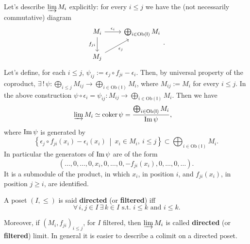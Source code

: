 \begin{ex}
	Let's describe $\varinjlim M_i$ explicitly: for every $i \leq j$ we have the (not necessarily commutative) diagram
	\begin{equation}
	\begin{tikzcd}
		M_i \arrow[r, "\epsilon_i", rightarrow] \arrow[d, "f_{ji}"', rightarrow] &
		\bigoplus_{i \in \mathrm{Ob} \left(\mathsf{I}\right)} M_i \\
		M_j \arrow[ru, "\epsilon_j"', rightarrow] & 
	\end{tikzcd} 
	.\end{equation}
	Let's define, for each $i \leq j$, $\psi_{ij} := \epsilon_j \circ f_{ji} - \epsilon_i$.
	Then, by universal property of the coproduct,
	$\exists\, !\, \psi: \bigoplus_{i \leq j} M_{ij} \to \bigoplus_{i \in \mathrm{Ob} \left(\mathsf{I}\right)} M_{i}$,
	where $M_{ij} := M_i$ for every $i \leq j$.
	In the above construction $\psi \circ \epsilon_i = \psi_{ij}: M_{ij} \to \bigoplus_{i \in \mathrm{Ob} \left(\mathsf{I}\right)} M_i$.
	Then we have
	\begin{align}
		\varinjlim M_i &\simeq \operatorname{coker} \psi =
		\frac{\bigoplus_{i \in \mathrm{Ob} \left(\mathsf{I}\right)} M_i}{\operatorname{Im} \psi}
	,\end{align}
	where $\operatorname{Im} \psi$ is generated by
	\begin{equation}
		\left\{ \epsilon_j \circ f_{ji}(x_i) - \epsilon_i(x_i) \ \middle|\ 
		x_i \in M_i,\ i \leq j \right\} \subset
		\bigoplus_{i \in \mathrm{Ob} \left(\mathsf{I}\right)} M_i
	.\end{equation} 
	In particular the generators of $\operatorname{Im} \psi$ are of the form
	\begin{equation}
		\left( \ldots, 0, \ldots, 
		0, x_i, 0, \ldots, 0, - f_{ji}(x_i),
		0, \ldots, 0, \ldots \right)
	.\end{equation} 	
	It is a submodule of the product, in which $x_i$, in position $i$,
	and $f_{ji}(x_i)$, in position $j \geq i$, are identified.
\end{ex}

\begin{defn}
	A poset $\left(I, \leq \right)$ is said \textbf{directed} (or \textbf{filtered}) iff
	\begin{equation}
	\,\forall\,  i, j \in I \ \exists\, k \in I \text{ s.t. } i \leq k \text{ and } i \leq k
	.\end{equation} 
\end{defn}
Moreover, if $\left(M_i, f_{ji}\right)_{i \leq j}$, for $I$ filtered, then $\varinjlim M_i$ is called
\textbf{directed} (or \textbf{filtered}) limit.
In general it is easier to describe a colimit on a directed poset.

